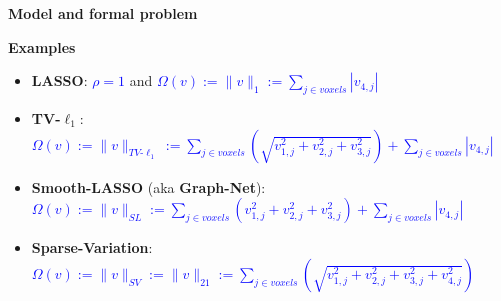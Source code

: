 \documentclass[french]{STIC_poster}
\begin{document}
\begin{frame}[t]
\begin{columns}[t]
\begin{column}{.48\linewidth}
\begin{sxbox}[\textwidth]{\textbf{Model and formal problem}}
\begin{itemize}
\begin{itemize}
                                    \end{itemize}
                                  \begin{nbox}{\textbf{Examples}}
                                  \begin{itemize}
                                  \item \textbf{LASSO}: \textcolor{blue}{$\rho=1$} and \textcolor{blue}{$\Omega(v):=\|v\|_1:= \sum_{j\in voxels}{|v_{4,j}|}$}
                                  \item \textbf{TV-$\ell_1$}:
                                    \textcolor{blue}{$\Omega(v):=\|v\|_{TV\text{-}\ell_1}:=\sum_{j \in voxels}{\left(\sqrt{v_{1,j}^2 + v_{2,j}^2 + v_{3,j}^2}\right)} + \sum_{j \in voxels}{|v_{4,j}|}$}
                                  \item \textbf{Smooth-LASSO} (aka \textbf{Graph-Net}):\\
                                    \textcolor{blue}{$\Omega(v):=\|v\|_{SL}:=\sum_{j \in voxels}{\left(v_{1,j}^2 + v_{2,j}^2 + v_{3,j}^2\right)} + \sum_{j \in voxels}{|v_{4,j}|}$}
                                  \item \textbf{Sparse-Variation}:
                                    \textcolor{blue}{$\Omega(v):=\|v\|_{SV} := \|v\|_{21}:=\sum_{j \in voxels}{\left(\sqrt{v_{1,j}^2 + v_{2,j}^2 + v_{3,j}^2 + v_{4,j}^2}\right)}$}
                                  \end{itemize}
                                  \end{nbox}
                                  \end{itemize}

				\end{sxbox}


\end{column}
\end{columns}
\end{frame}
\end{document}
